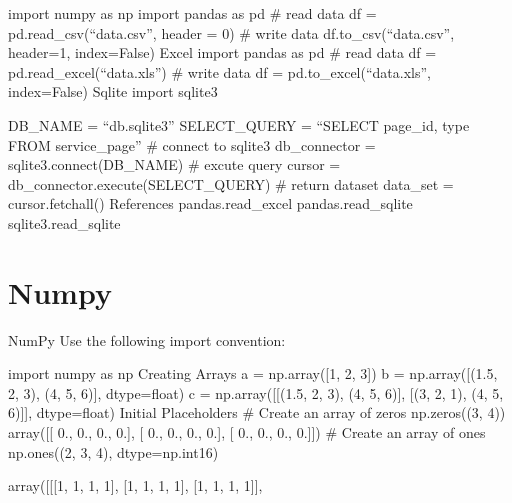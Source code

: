 import numpy as np
import pandas as pd
# read data
df = pd.read_csv(“data.csv”, header = 0)
# write data
df.to_csv(“data.csv”, header=1, index=False)
Excel
import pandas as pd
# read data
df = pd.read_excel(“data.xls”)
# write data
df = pd.to_excel(“data.xls”, index=False)
Sqlite
import sqlite3

DB_NAME = “db.sqlite3”
SELECT_QUERY = “SELECT page_id, type FROM service_page”
# connect to sqlite3
db_connector = sqlite3.connect(DB_NAME)
# excute query
cursor = db_connector.execute(SELECT_QUERY)
# return dataset
data_set = cursor.fetchall()
References
pandas.read_excel
pandas.read_sqlite
sqlite3.read_sqlite

\section{Numpy}
NumPy
Use the following import convention:

import numpy as np
Creating Arrays
a = np.array([1, 2, 3])
b = np.array([(1.5, 2, 3), (4, 5, 6)], dtype=float)
c = np.array([[(1.5, 2, 3), (4, 5, 6)], [(3, 2, 1), (4, 5, 6)]], dtype=float)
Initial Placeholders
# Create an array of zeros
np.zeros((3, 4))
array([[ 0., 0., 0., 0.], [ 0., 0., 0., 0.], [ 0., 0., 0., 0.]])
# Create an array of ones
np.ones((2, 3, 4), dtype=np.int16)

    array([[[1, 1, 1, 1],
            [1, 1, 1, 1],
            [1, 1, 1, 1]],

